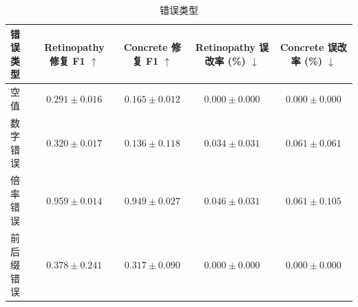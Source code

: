 \begin{table}[tb]
\centering
\caption{错误类型}
\label{tab:robust-type}
\fontsize{8}{9.6}\selectfont
\setlength{\tabcolsep}{3pt}
\renewcommand{\arraystretch}{1.10}
\begin{tabular*}{\columnwidth}{@{\extracolsep{\fill}}lcccc@{}}
\toprule
错误类型 & \makecell{Retinopathy\\修复 F1 $\uparrow$} & \makecell{Concrete\\修复 F1 $\uparrow$} & \makecell{Retinopathy\\误改率 (\%) $\downarrow$} & \makecell{Concrete\\误改率 (\%) $\downarrow$} \\
\midrule
空值 & $0.291\pm0.016$ & $0.165\pm0.012$ & $0.000\pm0.000$ & $0.000\pm0.000$ \\
数字错误 & $0.320\pm0.017$ & $0.136\pm0.118$ & $0.034\pm0.031$ & $0.061\pm0.061$ \\
倍率错误 & $0.959\pm0.014$ & $0.949\pm0.027$ & $0.046\pm0.031$ & $0.061\pm0.105$ \\
前后缀错误 & $0.378\pm0.241$ & $0.317\pm0.090$ & $0.000\pm0.000$ & $0.000\pm0.000$ \\
\bottomrule
\end{tabular*}
\end{table}

